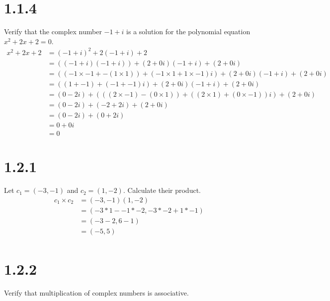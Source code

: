 \documentclass[11pt]{article}
\begin{document}

\section{1.1.4}
Verify that the complex number $-1 + i$ is a solution for the polynomial equation $x^2 + 2x + 2 = 0$.
\begin{align*}
	x^2 + 2x + 2 &= (-1 + i)^2 + 2(-1 + i) + 2 \\
		     &= ((-1 + i)(-1 + i)) + (2 + 0i)(-1 + i) + (2 + 0i) \\
		     &= ((-1\times -1 + -(1 \times 1)) + (-1 \times 1 + 1 \times -1)i) + (2 + 0i)(-1 + i) + (2 + 0i) \\
		     &= ((1 + -1) + (-1 + -1)i) + (2 + 0i)(-1 + i) + (2 + 0i) \\
		     &= (0 - 2i) + (((2 \times -1) - (0 \times 1)) + ((2 \times 1) + (0 \times -1))i) + (2 + 0i) \\
		     &= (0 - 2i) + (-2 + 2i) + (2 + 0i) \\
		     &= (0 - 2i) + (0 + 2i) \\
		     &= 0 + 0i \\
	             &= 0
\end{align*}


\section{1.2.1} Let $c_1 = (-3,-1)$ and $c_2 = (1,-2)$. Calculate their product.
\begin{align*}
	c_1 \times c_2 &= (-3,-1)(1,-2) \\
		       &= (-3*1 - -1*-2, -3*-2 + 1*-1) \\
		       &= (-3 - 2, 6 - 1)\\
		       &= (-5, 5) \\
\end{align*}


\newpage

\section{1.2.2}
Verify that multiplication of complex numbers is associative.
\end{document}

